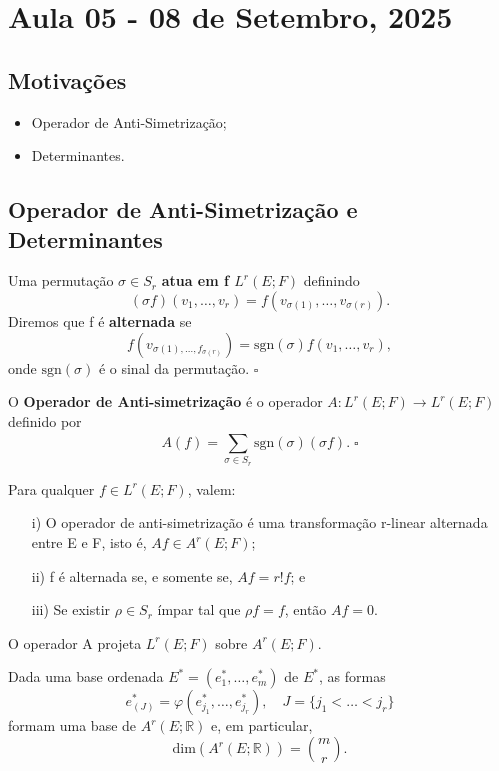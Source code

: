 \documentclass[../differential_forms.tex]{subfiles}
\begin{document}
\section{Aula 05 - 08 de Setembro, 2025}
\subsection{Motivações}
\begin{itemize}
 \item Operador de Anti-Simetrização;
 \item Determinantes.
\end{itemize}
\subsection{Operador de Anti-Simetrização e Determinantes}
\begin{def*}
  Uma permutação \(\sigma \in S_r\) \textbf{atua em f \(L^{r}(E; F)\)} definindo 
    \[
      (\sigma f)(v_1,\dotsc ,v_r) = f(v_{\sigma (1)}, \dotsc , v_{\sigma (r)}).
    \]
    Diremos que f é \textbf{alternada} se 
      \[
        f(v_{\sigma (1),\dotsc , f_{\sigma (r)}})= \mathrm{sgn}(\sigma )f(v_1,\dotsc ,v_r),
      \]
      onde \(\mathrm{sgn}(\sigma )\) é o sinal da permutação. \(\square\)
\end{def*}
\begin{def*}
  O \textbf{Operador de Anti-simetrização} é o operador \(A:L^{r}(E; F)\rightarrow L^{r}(E; F)\) definido por 
    \[
      A(f)= \sum\limits_{\sigma \in S_r}^{} \mathrm{sgn}(\sigma )(\sigma f). \; \square
    \]
\end{def*}
\begin{prop*}
  Para qualquer \(f\in L^{r}(E; F)\), valem: 
 \begin{itemize}
   \item[i)] O operador de anti-simetrização é uma transformação r-linear alternada entre E e F, isto é, \(Af\in A^{r}(E; F)\);
     \item[ii)] f é alternada se, e somente se, \(Af=r!f\); e 
       \item[iii)] Se existir \(\rho \in S_r\) ímpar tal que \(\rho f = f\), então \(Af=0\).
 \end{itemize}
\end{prop*}
\begin{crl*}
  O operador A projeta \(L^{r}(E; F)\) sobre \(A^{r}(E; F)\).
\end{crl*}
\begin{prop*}
   Dada uma base ordenada \(E^{*}=(e_{1}^{*}, \dotsc , e_{m}^{*})\) de \(E^{*}\), as formas 
     \[
       e_{(J)}^{*}=\varphi (e_{j_1}^{*}, \dotsc , e_{j_r}^{*}), \quad J = \{j_1<\dotsc <j_r\}
     \]
     formam uma base de \(A^{r}(E; \mathbb{R})\) e, em particular, 
       \[
         \mathrm{dim}(A^{r}(E; \mathbb{R}))= \binom{m}{r}.
       \]
\end{prop*}
\end{document}
